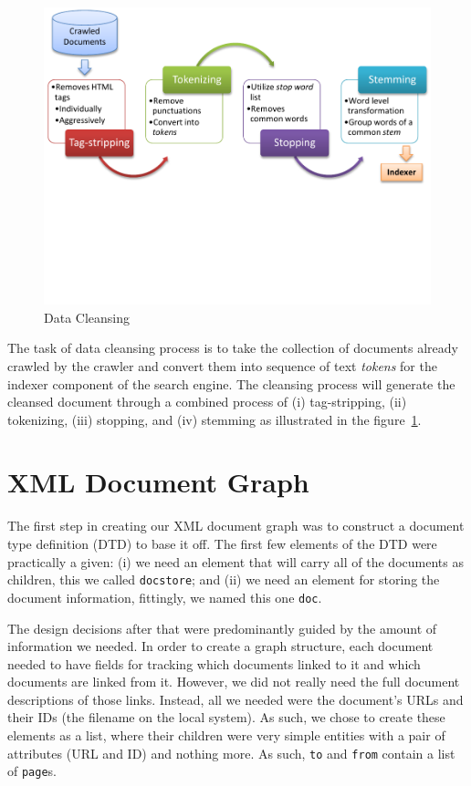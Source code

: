 \documentclass[letterpaper,11pt,twoside]{article}
\begin{document}
\begin{figure}[htb]
 \centering
 \includegraphics[trim=0.0in 2.00in 0.0in 0.0in, clip, page=1]{figures.pdf}
 \caption{Data Cleansing}
 \label{fig:data_cleansing}
\end{figure}

The task of data cleansing process is to take the collection of documents already crawled by the crawler and convert them into sequence of text \emph{tokens} for the indexer component of the search engine. The cleansing process will generate the cleansed document through a combined process of (i) tag-stripping, (ii) tokenizing, (iii) stopping, and (iv) stemming as illustrated in the figure~\ref{fig:data_cleansing}.

\section{XML Document Graph}
The first step in creating our XML document graph was to construct a document type definition (DTD) to base it off. The first few elements of the DTD were practically a given: (i) we need an element that will carry all of the documents as children, this we called \texttt{docstore}; and (ii) we need an element for storing the document information, fittingly, we named this one \texttt{doc}.

The design decisions after that were predominantly guided by the amount of information we needed. In order to create a graph structure, each document needed to have fields for tracking which documents linked to it and which documents are linked from it. However, we did not really need the full document descriptions of those links. Instead, all we needed were the document's URLs and their IDs (the filename on the local system). As such, we chose to create these elements as a list, where their children were very simple entities with a pair of attributes (URL and ID) and nothing more. As such, \texttt{to} and \texttt{from} contain a list of \texttt{page}s.
\end{document}
